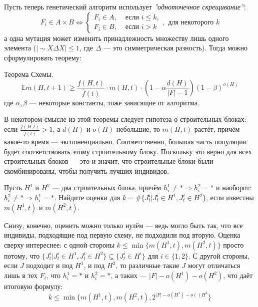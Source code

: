 Пусть теперь генетический алгоритм использует \textit{''одноточечное скрещивание''}: $$F_i \in A \times B \Leftrightarrow \begin{cases}
    F_i \in A, & \text{ если } i \leqslant k,\\
    F_i \in B, & \text{ если } i > k
\end{cases}, \textit{ для некоторого } k$$
а одна мутация может изменить принадлежность множеству лишь одного элемента ($|\sim X \Delta X| \leqslant 1$, где $\Delta$ --- это симметрическая разность).
Тогда можно сформулировать теорему:
\begin{theorem}
    Теорема Схемы.
    $$\mathbb{E}m(H, t + 1) \geqslant \frac{f(H, t)}{\overline{f}(t)}\cdot m(H, t)\cdot\left(1 - \alpha\frac{d(H)}{|F| - 1}\right)(1 - \beta)^{o(H)}$$
    где $\alpha, \beta$ --- некоторые константы, тоже зависящие от алгоритма.
\end{theorem}

\begin{corollary}
    В некотором смысле из этой теоремы следует гипотеза о строительных блоках: если $\frac{f(H, t)}{\overline{f}(t)} > 1$, а $d(H)$ и $o(H)$ небольшие, то $m(H, t)$ растёт, причём какое-то время --- экспоненциально. Соответственно, большая часть популяции будет соответствовать этому строительному блоку. Поскольку это верно для всех строительных блоков --- это и значит, что строительные блоки были скомбинированы, чтобы получить лучших индивидов.
\end{corollary}

\begin{problem}
    Пусть $H^1$ и $H^2$ --- два строительных блока, причём $h^1_i \neq * \Rightarrow h^2_i = *$ и наоборот: $h^2_i \neq * \Rightarrow h^1_i = *$. Найдите оценки для $k = \#\{J_t^i| J_t^i \in H^1, J_t^i \in H^2\}$, если известны $m(H^1, t)$ и $m(H^2, t)$.
\end{problem}
\begin{solution}
    Снизу, конечно, оценить можно только нулём --- ведь могло быть так, что все индивиды, подходящие под первую схему, не подходили под вторую. Оценка сверху интереснее: с одной стороны $k \leqslant \min\{m(H^1, t), m(H^2, t)\}$ просто потому, что $\{J_t^i| J_t^i \in H^1, J_t^i \in H^2\} \subseteq \{J_t^i \in H^i\}$ для $i \in \{1, 2\}$. С другой стороны, если $J$ подходит и под $H^1$, и под $H^2$, то различные такие $J$ могут отличаться лишь в тех $F_i$, что $h_i^1 = *$ и $h_i^2 = *$, а таких --- $|F| - o(H^1) - o(H^2)$, что даёт итоговую формулу:
    $$k \leqslant \min\{m(H^1, t), m(H^2, t), 2^{|F| - o(H^1) - o()H^2}\}$$
\end{solution}





